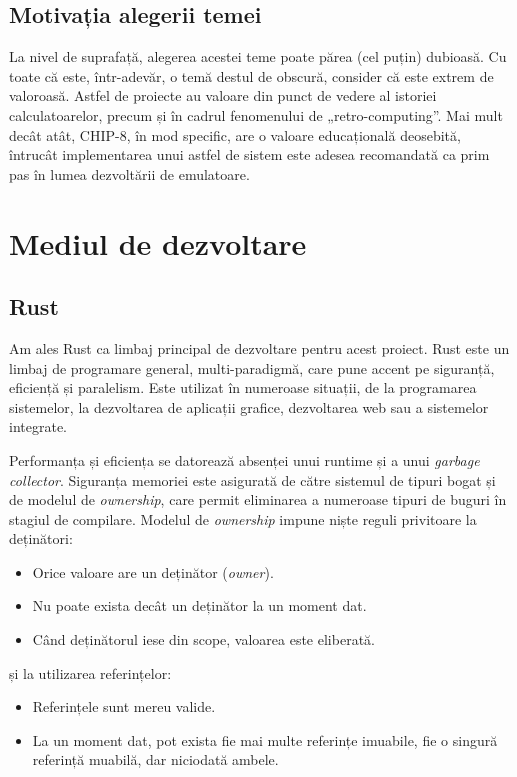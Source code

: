\documentclass[a4paper]{article}
\begin{document}
\subsection{Motivația alegerii temei}
La nivel de suprafață, alegerea acestei teme poate părea (cel puțin) dubioasă. Cu toate că este, într-adevăr, o temă destul de obscură, consider
că este extrem de valoroasă. Astfel de proiecte au valoare din punct de vedere al istoriei calculatoarelor, precum și în cadrul fenomenului de
„retro-computing”. Mai mult decât atât, CHIP-8, în mod specific, are o valoare educațională deosebită, întrucât implementarea unui astfel de
sistem este adesea recomandată ca prim pas în lumea dezvoltării de emulatoare\cite{langhoff}.

\section{Mediul de dezvoltare}
\subsection{Rust}
Am ales Rust ca limbaj principal de dezvoltare pentru acest proiect. Rust este un limbaj de programare general, multi-paradigmă, care pune accent
pe siguranță, eficiență și paralelism. Este utilizat în numeroase situații, de la programarea sistemelor, la dezvoltarea de aplicații grafice, dezvoltarea
web sau a sistemelor integrate.

Performanța și eficiența se datorează absenței unui runtime și a unui \textit{garbage collector}. Siguranța memoriei este asigurată de către sistemul
de tipuri bogat și de modelul de \textit{ownership}, care permit eliminarea a numeroase tipuri de buguri în stagiul de compilare\cite{rsorg}. Modelul
de \textit{ownership} impune niște reguli privitoare la deținători\cite[Cap.~4.1]{rustbook}:
\begin{itemize}
	\item Orice valoare are un deținător (\textit{owner}).
	\item Nu poate exista decât un deținător la un moment dat.
	\item Când deținătorul iese din scope, valoarea este eliberată.
\end{itemize}
și la utilizarea referințelor\cite[Cap.~4.2]{rustbook}:
\begin{itemize}
	\item Referințele sunt mereu valide.
	\item La un moment dat, pot exista fie mai multe referințe imuabile, fie o singură referință muabilă, dar niciodată ambele.
\end{itemize}
\end{document}
